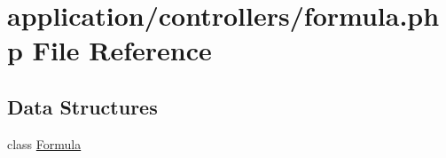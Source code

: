 \hypertarget{formula_8php}{\section{application/controllers/formula.php File Reference}
\label{formula_8php}
}
\subsection*{Data Structures}
\begin{DoxyCompactItemize}
\item 
class \hyperlink{class_formula}{Formula}
\end{DoxyCompactItemize}
